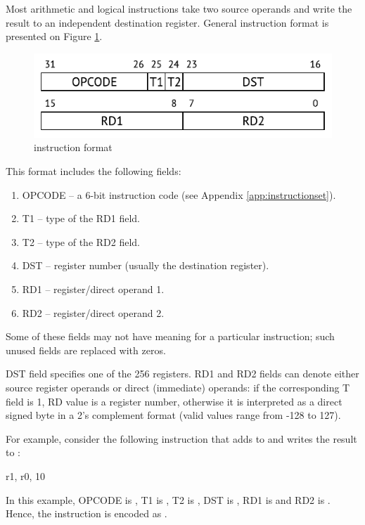 \documentclass[a4paper,12pt,twoside,extrafontsizes]{memoir}
\begin{document}
Most arithmetic and logical instructions take two source operands and write the result to an independent destination register. General instruction format is presented on Figure \ref{fig:instructionformat}.

\begin{figure}[htbp]
	\centering
	\includegraphics[scale=1.2]{images/instructionformat.pdf}
	\caption{\lxp{} instruction format}
	\label{fig:instructionformat}
\end{figure}

This format includes the following fields:

\begin{enumerate}
	\item OPCODE -- a 6-bit instruction code (see Appendix \ref{app:instructionset}).
	\item T1 -- type of the RD1 field.
	\item T2 -- type of the RD2 field.
	\item DST -- register number (usually the destination register).
	\item RD1 -- register/direct operand 1.
	\item RD2 -- register/direct operand 2.
\end{enumerate}

Some of these fields may not have meaning for a particular instruction; such unused fields are replaced with zeros.

DST field specifies one of the 256 \lxp{} registers. RD1 and RD2 fields can denote either source register operands or direct (immediate) operands: if the corresponding T field is 1, RD value is a register number, otherwise it is interpreted as a direct signed byte in a 2's complement format (valid values range from -128 to 127).

For example, consider the following instruction that adds  to  and writes the result to :

\begin{codepar}
     r1, r0, 10
\end{codepar}

In this example, OPCODE is , T1 is , T2 is , DST is , RD1 is  and RD2 is . Hence, the instruction is encoded as .
\end{document}
